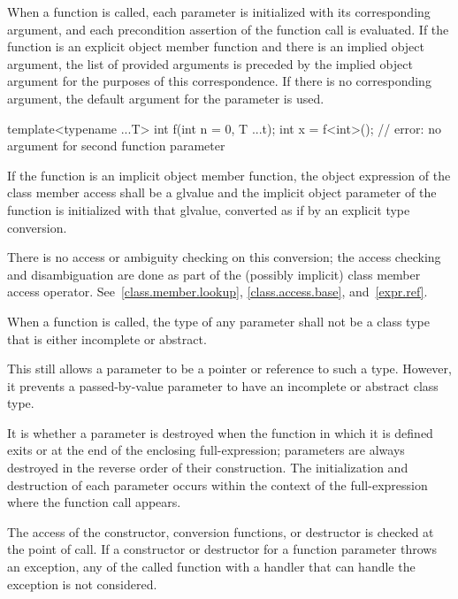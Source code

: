 \pnum
{}%
%
%
When a function is called, each parameter is
initialized with
its corresponding argument,
and each precondition assertion of the function call
is evaluated.
If the function is an explicit object member function and
there is an implied object argument,
the list of provided arguments is preceded by the implied object argument
for the purposes of this correspondence.
If there is no corresponding argument,
the default argument for the parameter is used.
\begin{example}
\begin{codeblock}
template<typename ...T> int f(int n = 0, T ...t);
int x = f<int>();               // error: no argument for second function parameter
\end{codeblock}
\end{example}
If the function is an implicit object member
function,
the object expression of the class member access shall be a glvalue and
the implicit object parameter of the function
is initialized with that glvalue,
converted as if by an explicit type conversion.
\begin{note}
There is no access or ambiguity checking on this conversion; the access
checking and disambiguation are done as part of the (possibly implicit)
class member access operator.
See~\ref{class.member.lookup}, \ref{class.access.base},
and~\ref{expr.ref}.
\end{note}
When a function is called, the type of any parameter
shall not be a class type that is either incomplete or abstract.
\begin{note}
This still allows a parameter to be a pointer or reference to such
a type. However, it prevents a passed-by-value parameter
to have an incomplete or abstract class type.
\end{note}
It is 
whether a parameter is destroyed
when the function in which it is defined exits
or at the end of the enclosing full-expression;
parameters are always destroyed in the reverse order of their construction.
The initialization and destruction of each parameter occurs
within the context of the full-expression
where the function call appears.
\begin{example}
The access of the
constructor, conversion functions, or destructor is
checked at the point of call. If a constructor
or destructor for a function parameter throws an exception,
any 
of the called function
with a handler that can handle the exception
is not considered.
\end{example}


